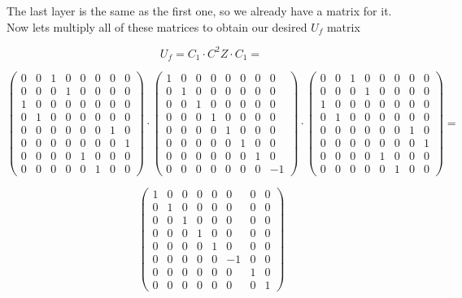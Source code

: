 The last layer is the same as the first one, so we already have a matrix for it. Now lets multiply all of these matrices to obtain our desired $U_f$ matrix

\[ U_f = C_1 \cdot C^2Z \cdot C_1 = \]

\[ \begin{pmatrix}
0 & 0 & 1 & 0 & 0 & 0 & 0 & 0 \\
0 & 0 & 0 & 1 & 0 & 0 & 0 & 0 \\
1 & 0 & 0 & 0 & 0 & 0 & 0 & 0 \\
0 & 1 & 0 & 0 & 0 & 0 & 0 & 0 \\
0 & 0 & 0 & 0 & 0 & 0 & 1 & 0 \\
0 & 0 & 0 & 0 & 0 & 0 & 0 & 1 \\
0 & 0 & 0 & 0 & 1 & 0 & 0 & 0 \\
0 & 0 & 0 & 0 & 0 & 1 & 0 & 0
\end{pmatrix} \cdot \begin{pmatrix}
1 & 0 & 0 & 0 & 0 & 0 & 0 & 0 \\
0 & 1 & 0 & 0 & 0 & 0 & 0 & 0 \\
0 & 0 & 1 & 0 & 0 & 0 & 0 & 0 \\
0 & 0 & 0 & 1 & 0 & 0 & 0 & 0 \\
0 & 0 & 0 & 0 & 1 & 0 & 0 & 0 \\
0 & 0 & 0 & 0 & 0 & 1 & 0 & 0 \\
0 & 0 & 0 & 0 & 0 & 0 & 1 & 0 \\
0 & 0 & 0 & 0 & 0 & 0 & 0 & -1
\end{pmatrix} \cdot \begin{pmatrix}
0 & 0 & 1 & 0 & 0 & 0 & 0 & 0 \\
0 & 0 & 0 & 1 & 0 & 0 & 0 & 0 \\
1 & 0 & 0 & 0 & 0 & 0 & 0 & 0 \\
0 & 1 & 0 & 0 & 0 & 0 & 0 & 0 \\
0 & 0 & 0 & 0 & 0 & 0 & 1 & 0 \\
0 & 0 & 0 & 0 & 0 & 0 & 0 & 1 \\
0 & 0 & 0 & 0 & 1 & 0 & 0 & 0 \\
0 & 0 & 0 & 0 & 0 & 1 & 0 & 0
\end{pmatrix} = \]

\[
\begin{pmatrix}
1 & 0 & 0 & 0 & 0 & 0 & 0 & 0 \\
0 & 1 & 0 & 0 & 0 & 0 & 0 & 0 \\
0 & 0 & 1 & 0 & 0 & 0 & 0 & 0 \\
0 & 0 & 0 & 1 & 0 & 0 & 0 & 0 \\
0 & 0 & 0 & 0 & 1 & 0 & 0 & 0 \\
0 & 0 & 0 & 0 & 0 & -1 & 0 & 0 \\
0 & 0 & 0 & 0 & 0 & 0 & 1 & 0 \\
0 & 0 & 0 & 0 & 0 & 0 & 0 & 1
\end{pmatrix}
\]

